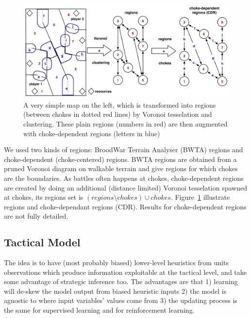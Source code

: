 \begin{figure}[ht]
\includegraphics[width=16cm]{images/terrain_analysis.png}
\caption{A very simple map on the left, which is transformed into regions (between chokes in dotted red lines) by Voronoi tesselation and clustering. These plain regions (numbers in red) are then augmented with choke-dependent regions (letters in blue)}%
\label{fig:terrainanalysis}
\end{figure}

We used two kinds of regions: BroodWar Terrain Analyser (BWTA) regions and choke-dependent (choke-centered) regions. BWTA regions are obtained from a pruned Voronoi diagram on walkable terrain \citep{Perkins2010} and give regions for which chokes are the boundaries. As battles often happens at chokes, choke-dependent regions are created by doing an additional (distance limited) Voronoi tesselation spawned at chokes, its regions set is $(regions \setminus chokes) \cup chokes$. Figure~\ref{fig:terrainanalysis} illustrate regions and choke-dependant regions (CDR). Results for choke-dependent regions are not fully detailed.

\subsection{Tactical Model}
The idea is to have (most probably biased) lower-level heuristics from units observations which produce information exploitable at the tactical level, and take some advantage of strategic inference too. The advantages are that 1) learning will de-skew the model output from biased heuristic inputs 2) the model is agnostic to where input variables' values come from 3) the updating process is the same for supervised learning and for reinforcement learning. 

